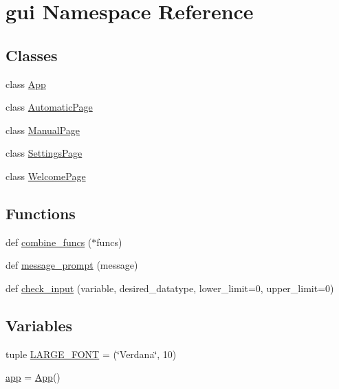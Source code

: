 \hypertarget{namespacegui}{}\section{gui Namespace Reference}
\label{namespacegui}
\subsection*{Classes}
\begin{DoxyCompactItemize}
\item 
class \mbox{\hyperlink{classgui_1_1_app}{App}}
\item 
class \mbox{\hyperlink{classgui_1_1_automatic_page}{Automatic\+Page}}
\item 
class \mbox{\hyperlink{classgui_1_1_manual_page}{Manual\+Page}}
\item 
class \mbox{\hyperlink{classgui_1_1_settings_page}{Settings\+Page}}
\item 
class \mbox{\hyperlink{classgui_1_1_welcome_page}{Welcome\+Page}}
\end{DoxyCompactItemize}
\subsection*{Functions}
\begin{DoxyCompactItemize}
\item 
def \mbox{\hyperlink{namespacegui_a8b03c359da973f07d331b9f8bacf8a06}{combine\+\_\+funcs}} ($\ast$funcs)
\item 
def \mbox{\hyperlink{namespacegui_a287ef9f754edef8c39da895297753642}{message\+\_\+prompt}} (message)
\item 
def \mbox{\hyperlink{namespacegui_a112dfa5ddd7d9664cf21062f7e725ce8}{check\+\_\+input}} (variable, desired\+\_\+datatype, lower\+\_\+limit=0, upper\+\_\+limit=0)
\end{DoxyCompactItemize}
\subsection*{Variables}
\begin{DoxyCompactItemize}
\item 
tuple \mbox{\hyperlink{namespacegui_ac177936c9562254841e5e7f5fa210fb1}{L\+A\+R\+G\+E\+\_\+\+F\+O\+NT}} = (\char`\"{}Verdana\char`\"{}, 10)
\item 
\mbox{\hyperlink{namespacegui_af263120175dda5fb802cbe5ce9490b93}{app}} = \mbox{\hyperlink{classgui_1_1_app}{App}}()
\end{DoxyCompactItemize}


